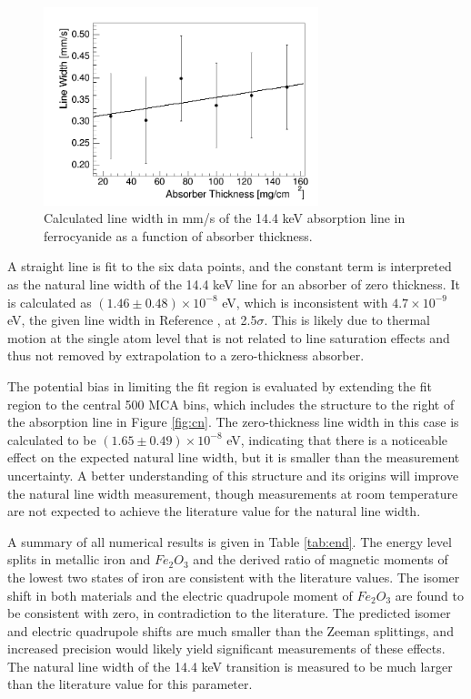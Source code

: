 \begin{figure}[htb]
\includegraphics[width=8cm]{linewidth.png}
\caption{Calculated line width in mm/s of the 14.4 keV absorption line in ferrocyanide as a function of absorber thickness.}
\label{fig:width}
\end{figure}

A straight line is fit to the six data points, and the constant term is interpreted as the natural line width of the 14.4 keV line for an absorber of zero thickness. It is calculated as $(1.46\pm0.48)\times 10^{-8}$ eV, which is inconsistent with $4.7\times10^{-9}$ eV, the given line width in Reference \cite{lab}, at 2.5$\sigma$. This is likely due to thermal motion at the single atom level that is not related to line saturation effects and thus not removed by extrapolation to a zero-thickness absorber. 

The potential bias in limiting the fit region is evaluated by extending the fit region to the central 500 MCA bins, which includes the structure to the right of the absorption line in Figure \ref{fig:cn}. The zero-thickness line width in this case is calculated to be $(1.65\pm0.49)\times 10^{-8}$ eV, indicating that there is a noticeable effect on the expected natural line width, but it is smaller than the measurement uncertainty. A better understanding of this structure and its origins will improve the natural line width measurement, though measurements at room temperature are not expected to achieve the literature value for the natural line width. 

A summary of all numerical results is given in Table \ref{tab:end}. The energy level splits in metallic iron and $Fe_2O_3$ and the derived ratio of magnetic moments of the lowest two states of iron are consistent with the literature values. The isomer shift in both materials and the electric quadrupole moment of $Fe_2O_3$ are found to be consistent with zero, in contradiction to the literature. The predicted isomer and electric quadrupole shifts are much smaller than the Zeeman splittings, and increased precision would likely yield significant measurements of these effects. The natural line width of the 14.4 keV transition is measured to be much larger than the literature value for this parameter. 

